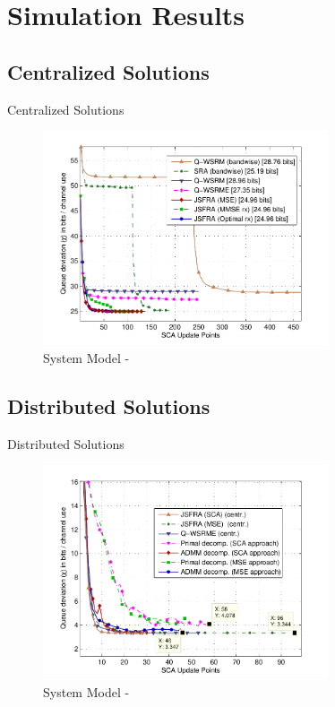 \documentclass[9pt]{beamer}
\begin{document}
\section{Simulation Results}

\subsection{Centralized Solutions}

\begin{frame}{Centralized Solutions}
\begin{figure}
	\centering
	\includegraphics[width=0.75\textwidth]{fig-2-5}
	\caption{System Model - }
\end{figure}
\end{frame}

\subsection{Distributed Solutions}

\begin{frame}{Distributed Solutions}
	\begin{figure}
		\centering
		\includegraphics[width=0.75\textwidth]{fig-3-2}
		\caption{System Model - }
	\end{figure}
\end{frame}
\end{document}
